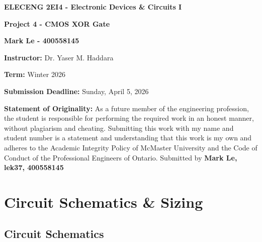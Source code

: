 \documentclass[12pt]{article}
\begin{document}
    
    \begin{titlepage}
    \begin{center}
    \vspace*{\fill}

    {\LARGE \textbf{ELECENG 2EI4 - Electronic Devices \& Circuits I}\par}
    \vspace{2.5cm}

    {\LARGE\bfseries Project 4 - CMOS XOR Gate\par}
    \vspace{2.5cm}
    
    {\Large \textbf{Mark Le - 400558145}\par}
    \vspace{2.5cm}
    
    {\large \textbf{Instructor:} Dr. Yaser M. Haddara\par}
    \vspace{0.5cm}
    {\large \textbf{Term:} Winter 2026 \par}
    \vspace{0.5cm}
    
    {\large \textbf{Submission Deadline:} Sunday, April 5, 2026\par}
    \end{center}

    \vspace*{\fill}

    \textbf{Statement of Originality:} As a future member of the engineering profession, the student is responsible for performing the required work in an honest manner, without plagiarism and cheating. Submitting this work with my name and student number is a statement and understanding that this work is my own and adheres to the Academic Integrity Policy of McMaster University and the Code of Conduct of the Professional Engineers of Ontario. Submitted by \textbf{Mark Le, lek37, 400558145}

\end{titlepage}

    \newpage
    \tableofcontents


    \newpage

    \section{Circuit Schematics \& Sizing}

    \subsection{Circuit Schematics}
\end{document}
